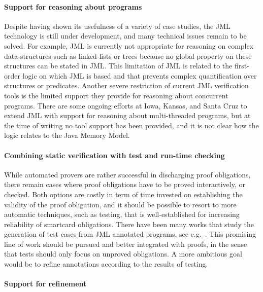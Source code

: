 \paragraph{Support for reasoning about programs}
Despite having shown its usefulness of a variety of case studies, the
JML technology is still under development, and many technical issues
remain to be solved. For example, JML is currently not appropriate for
reasoning on complex data-structures such as linked-lists or trees
because no global property on these structures can be stated in JML.
This limitation of JML is related to the first-order logic on which
JML is based and that prevents complex quantification over structures
or predicates. Another severe restriction of current JML verification
tools is the limited support they provide for reasoning about
concurrent programs.  There are some ongoing efforts at Iowa, Kansas,
and Santa Cruz to extend JML with support for reasoning about
multi-threaded programs, but at the time of writing no tool support
has been provided, and it is not clear how the logic relates to the
Java Memory Model.



\paragraph{Combining static verification with test and run-time checking}
While automated provers are rather successful in discharging proof
obligations, there remain cases where proof obligations have to be
proved interactively, or checked. Both options are costly in term of
time invested on establishing the validity of the proof obligation,
and it should be possible to resort to more automatic techniques, such
as testing, that is well-established for increasing reliability of
smartcard obligations. There have been many works that study the
generation of test cases from JML annotated programs, see
e.g.~\cite{jll04:ase}. This promising line of work should be pursued
and better integrated with proofs, in the sense that tests should only
focus on unproved obligations. A more ambitious goal would be to refine
annotations according to the results of testing.


\paragraph{Support for refinement}





